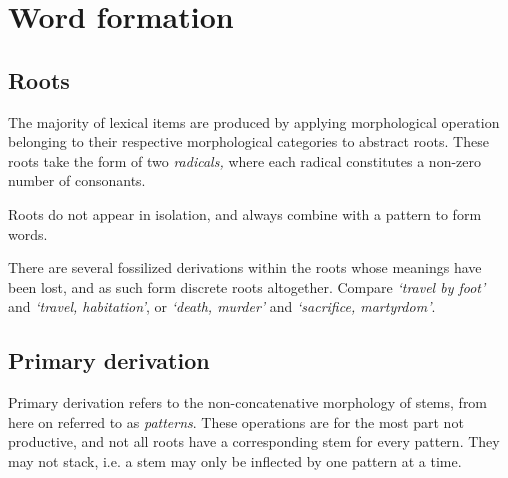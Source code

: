 \chapter{Word formation}
\section{Roots}

The majority of lexical items are produced by applying morphological operation belonging to their respective morphological categories to abstract roots. These roots take the form of two \emph{radicals,} where each radical constitutes a non-zero number of consonants. 

Roots do not appear in isolation, and always combine with a pattern to form words.

There are several fossilized derivations within the roots whose meanings have been lost, and as such form discrete roots altogether. Compare  \emph{`travel by foot'} and  \emph{`travel, habitation'}, or  \emph{`death, murder'} and  \emph{`sacrifice, martyrdom'}.

\section{Primary derivation}

Primary derivation refers to the non-concatenative morphology of stems, from here on referred to as \textit{patterns}. These operations are for the most part not productive, and not all roots have a corresponding stem for every pattern. They may not stack, i.e. a stem may only be inflected by one pattern at a time.

